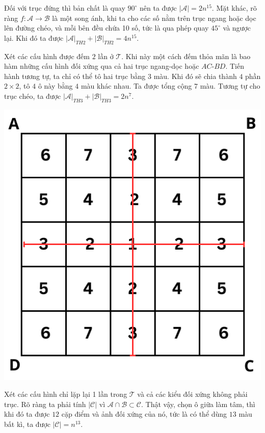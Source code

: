 \documentclass[11pt]{scrartcl}
\begin{document}
\begin{itemize}[label=, leftmargin=0em, itemsep=0.5em]
\begin{sol}
\begin{center}
            \end{center}
            Đối với trục đứng thì bản chất là quay $90^{\circ}$ nên ta được $|\mathcal{A}| = 2n^{15}$. Mặt khác, rõ ràng $f: \mathcal{A} \to \mathcal{B}$ là một song ánh, khi ta cho các số nằm trên trục ngang hoặc dọc lên đường chéo, và mỗi bên đều chứa 10 số, tức là qua phép quay $45^{\circ}$ và ngược lại. Khi đó ta được $|\mathcal{A}|_{TH2} + |\mathcal{B}|_{TH2} = 4n^{15}$.

            Xét các cấu hình được đếm $2$ lần ở $\mathcal{T}$. Khi này một cách đếm thỏa mãn là bao hàm những cấu hình đối xứng qua cả hai trục ngang-dọc hoặc $AC$-$BD$. Tiến hành tương tự, ta chỉ có thể tô hai trục bằng $3$ màu. Khi đó sẽ chia thành $4$ phần $2\times2$, tô $4$ ô này bằng $4$ màu khác nhau. Ta được tổng cộng $7$ màu. Tương tự cho trục chéo, ta được $|\mathcal{A}|_{TH3} + |\mathcal{B}|_{TH3} = 2n^{7}$.
            \begin{center}
                \includegraphics[scale=0.57]{Image/+.pdf}
            \end{center}
            Xét các cấu hình chỉ lặp lại 1 lần trong $\mathcal{T}$ và cả các kiểu đối xứng không phải trục. Rõ ràng ta phải tính $|\mathcal{C}|$ vì $\mathcal{A} \cap \mathcal{B} \subset \mathcal{C}$. Thật vậy, chọn ô giữa làm tâm, thì khi đó ta được $12$ cặp điểm và ảnh đối xứng của nó, tức là có thể dùng $13$ màu bất kì, ta được $|\mathcal{C}| = n^{13}$.

\end{sol}
\end{itemize}
\end{document}
